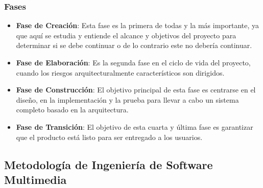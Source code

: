 \subsubsection{Fases}
\begin{itemize}
  \item \textbf{Fase de Creación}: Esta fase es la primera de todas y la más importante, ya que aquí se estudia y entiende el alcance y objetivos del proyecto para determinar si se debe continuar o de lo contrario este no debería continuar. 
  \item \textbf{Fase de Elaboración}: Es la segunda fase en el ciclo de vida del proyecto, cuando los riesgos arquitecturalmente característicos son dirigidos. 
  \item \textbf{Fase de Construcción}: El objetivo principal de esta fase es centrarse en el diseño, en la implementación y la prueba para llevar a cabo un sistema completo basado en la arquitectura.
  \item \textbf{Fase de Transición}: El objetivo de esta cuarta y última fase es garantizar que el producto está listo para ser entregado a los usuarios.
\end{itemize}

\subsection{Metodología de Ingeniería de Software Multimedia}

